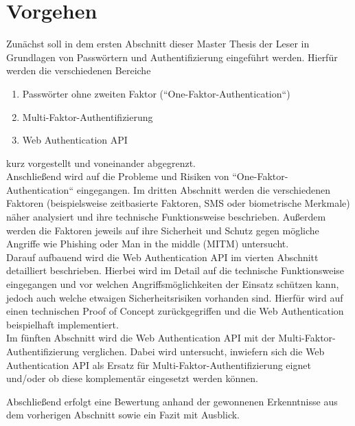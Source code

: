 \chapter{Vorgehen}


Zunächst soll in dem ersten Abschnitt dieser Master Thesis der Leser in Grundlagen von Passwörtern und Authentifizierung eingeführt werden. Hierfür werden die verschiedenen Bereiche
\begin{enumerate}
	\item Passwörter ohne zweiten Faktor (``One-Faktor-Authentication``)
	\item Multi-Faktor-Authentifizierung
	\item Web Authentication API
\end{enumerate}

kurz vorgestellt und voneinander abgegrenzt.\\

Anschließend wird auf die Probleme und Risiken von ``One-Faktor-Authentication`` eingegangen. Im dritten Abschnitt werden die verschiedenen Faktoren (beispielsweise zeitbasierte Faktoren, SMS oder biometrische Merkmale) näher analysiert und ihre technische Funktionsweise beschrieben. Außerdem werden die Faktoren jeweils auf ihre Sicherheit und Schutz gegen mögliche Angriffe wie Phishing oder Man in the middle (MITM) untersucht.\\
Darauf aufbauend wird die Web Authentication API im vierten Abschnitt detailliert beschrieben. Hierbei wird im Detail auf die technische Funktionsweise eingegangen und vor welchen Angriffsmöglichkeiten der Einsatz schützen kann, jedoch auch welche etwaigen Sicherheitsrisiken vorhanden sind. Hierfür wird auf einen technischen Proof of Concept zurückgegriffen und die Web Authentication beispielhaft implementiert.\\

Im fünften Abschnitt wird die Web Authentication API mit der Multi-Faktor-Authentifizierung verglichen. Dabei wird untersucht, inwiefern sich die Web Authentication API als Ersatz für Multi-Faktor-Authentifizierung eignet und/oder ob diese komplementär eingesetzt werden können.

Abschließend erfolgt eine Bewertung anhand der gewonnenen Erkenntnisse aus dem vorherigen Abschnitt sowie ein Fazit mit Ausblick.

